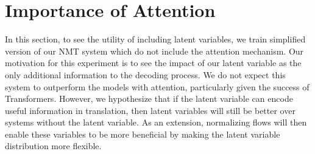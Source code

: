 





\section{Importance of Attention}

In this section, to see the utility of including latent variables, we train simplified version of our \ac{NMT} system which do not include the attention mechanism. Our motivation for this experiment is to see the impact of our latent variable as the only additional information to the decoding process. We do not expect this system to outperform the models with attention, particularly given the success of Transformers\cite{vaswani2017attentionTransformer}. However, we hypothesize that if the latent variable can encode useful information in translation, then latent variables will still be better over systems without the latent variable. As an extension, normalizing flows will then enable these variables to be more beneficial by making the latent variable distribution more flexible.

